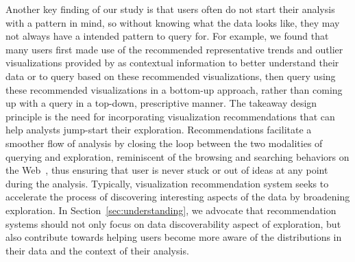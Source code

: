 \par Another key finding of our study is that users often do not start their analysis with a pattern in mind, so without knowing what the data looks like, they may not always have a intended pattern to query for. For example, we found that many users first made use of the recommended representative trends and outlier visualizations provided by \zv as contextual information to better understand their data or to query based on these recommended visualizations, then query using these recommended visualizations in a bottom-up approach, rather than coming up with a query in a top-down, prescriptive manner. The takeaway design principle is the need for incorporating visualization recommendations that can help analysts jump-start their exploration.  Recommendations facilitate a smoother flow of analysis by closing the loop between the two modalities of querying and exploration, reminiscent of the browsing and searching behaviors on the Web~\cite{Olston2003}, thus ensuring that user is never stuck or out of ideas at any point during the analysis. Typically, visualization recommendation system seeks to accelerate the process of discovering interesting aspects of the data by broadening exploration. In Section~\ref{sec:understanding}, we advocate that recommendation systems should not only focus on data discoverability aspect of exploration, but also contribute towards helping users become more aware of the distributions in their data and the context of their analysis.
